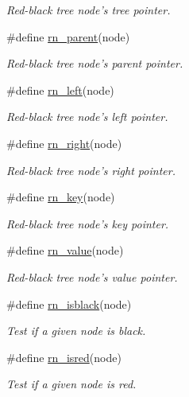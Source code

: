 \begin{CompactItemize}
\begin{CompactList}\small\item\em Red-black tree node's tree pointer.\item\end{CompactList}\item 
\#define \hyperlink{group__dbprim__rbtree_a29}{rn\_\-parent}(node)
\begin{CompactList}\small\item\em Red-black tree node's parent pointer.\item\end{CompactList}\item 
\#define \hyperlink{group__dbprim__rbtree_a30}{rn\_\-left}(node)
\begin{CompactList}\small\item\em Red-black tree node's left pointer.\item\end{CompactList}\item 
\#define \hyperlink{group__dbprim__rbtree_a31}{rn\_\-right}(node)
\begin{CompactList}\small\item\em Red-black tree node's right pointer.\item\end{CompactList}\item 
\#define \hyperlink{group__dbprim__rbtree_a32}{rn\_\-key}(node)
\begin{CompactList}\small\item\em Red-black tree node's key pointer.\item\end{CompactList}\item 
\#define \hyperlink{group__dbprim__rbtree_a33}{rn\_\-value}(node)
\begin{CompactList}\small\item\em Red-black tree node's value pointer.\item\end{CompactList}\item 
\#define \hyperlink{group__dbprim__rbtree_a34}{rn\_\-isblack}(node)
\begin{CompactList}\small\item\em Test if a given node is black.\item\end{CompactList}\item 
\#define \hyperlink{group__dbprim__rbtree_a35}{rn\_\-isred}(node)
\begin{CompactList}\small\item\em Test if a given node is red.\item\end{CompactList}\item 

\end{CompactItemize}
